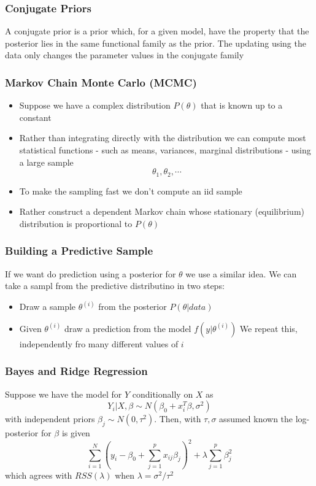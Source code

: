 \documentclass[11pt]{article}
\begin{document}
\subsubsection{Conjugate Priors}
A conjugate prior is a prior which, for a given model, have the property that the posterior lies in the same 
functional family as the prior. The updating using the data only changes the parameter values in the conjugate family
\subsubsection{Markov Chain Monte Carlo (MCMC)}
\begin{itemize}
    \item Suppose we have a complex distribution $P(\theta)$ that is known up to a constant
    \item Rather than integrating directly with the distribution we can compute most statistical functions - such as means, variances, marginal distributions - using a large sample \[\theta_1,\theta_2,\cdots\] 
    \item To make the sampling fast we don't compute an iid sample 
    \item Rather construct a dependent Markov chain whose stationary (equilibrium) distribution is proportional to $P(\theta)$ 
\end{itemize}
\subsubsection{Building a Predictive Sample}
If we want do prediction using a posterior for $\theta$ we use a similar idea. We can take a sampl from the predictive distributino in two steps:
\begin{itemize}
    \item Draw a sample $\theta^{(i)}$ from the posterior $P(\theta|data)$
    \item Given $\theta^{(i)}$ draw a prediction from the model $f(y|\theta^{(i)})$ We repeat this, independently fro many different values of $i$ 
\end{itemize}
\subsubsection{Bayes and Ridge Regression}
Suppose we have the model for $Y$ conditionally on $X$ as \[Y_i|X,\beta\sim N(\beta_0+x_i^T\beta, \sigma^2)\]    
with independent priors $\beta_j\sim N(0,\tau^2)$. Then, with $\tau, \sigma$ assumed known the log-posterior for $\beta$ is given 
\[\sum_{i=1}^{N}(y_i-\beta_0+\sum_{j=1}^{p}x_{ij}\beta_j)^2 + \lambda\sum_{j=1}^{p}\beta_j^2\]
which agrees with $RSS(\lambda)$ when $\lambda = \sigma^2 / \tau^2$
\end{document}
